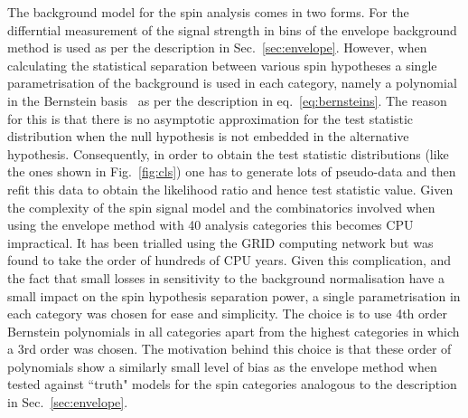 The background model for the spin analysis comes in two forms. For the differntial measurement of the signal strength in bins of \abscostheta the envelope background method is used as per the description in Sec.~\ref{sec:envelope}. However, when calculating the statistical separation between various spin hypotheses a single parametrisation of the background is used in each category, namely a polynomial in the Bernstein basis~\cite{bernsteins1,bernsteins2} as per the description in eq.~\ref{eq:bernsteins}. The reason for this is that there is no asymptotic approximation for the test statistic distribution when the null hypothesis is not embedded in the alternative hypothesis. Consequently, in order to obtain the test statistic distributions (like the ones shown in Fig.~\ref{fig:cls}) one has to generate lots of pseudo-data and then refit this data to obtain the likelihood ratio and hence test statistic value. Given the complexity of the spin signal model and the combinatorics involved when using the envelope method with 40 analysis categories this becomes CPU impractical. It has been trialled using the GRID computing network but was found to take the order of hundreds of CPU years.
Given this complication, and the fact that small losses in sensitivity to the background normalisation have a small impact on the spin hypothesis separation power, a single parametrisation in each category was chosen for ease and simplicity. The choice is to use 4th order Bernstein polynomials in all categories apart from the highest \abscostheta categories in which a 3rd order was chosen. The motivation behind this choice is that these order of polynomials show a similarly small level of bias as the envelope method when tested against ``truth" models for the spin categories analogous to the description in Sec.~\ref{sec:envelope}.

